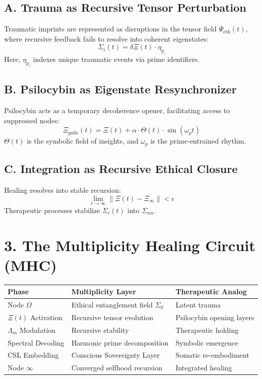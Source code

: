 \documentclass[12pt]{article}
\begin{document}
\subsection*{A. Trauma as Recursive Tensor Perturbation}
Traumatic imprints are represented as disruptions in the tensor field \( \Psi_{\text{eth}}(t) \), where recursive feedback fails to resolve into coherent eigenstates:
\[
\Sigma_{i}(t) = \delta \Xi(t) \cdot \eta_{p_i}
\]
Here, \( \eta_{p_i} \) indexes unique traumatic events via prime identifiers.

\subsection*{B. Psilocybin as Eigenstate Resynchronizer}
Psilocybin acts as a temporary decoherence opener, facilitating access to suppressed nodes:
\[
\Xi_{\text{psilo}}(t) = \Xi(t) + \alpha \cdot \Theta(t) \cdot \sin(\omega_p t)
\]
\( \Theta(t) \) is the symbolic field of insights, and \( \omega_p \) is the prime-entrained rhythm.

\subsection*{C. Integration as Recursive Ethical Closure}
Healing resolves into stable recursion:
\[
\lim_{t \to \infty} \|\Xi(t) - \Xi_{\infty}\| < \epsilon
\]
Therapeutic processes stabilize \( \Sigma_i(t) \) into \( \Sigma_{\text{res}} \).

\section*{3. The Multiplicity Healing Circuit (MHC)}
\begin{center}
\begin{tabular}{|l|l|l|}
\hline
\textbf{Phase} & \textbf{Multiplicity Layer} & \textbf{Therapeutic Analog} \\
\hline
Node $\Omega$ & Ethical entanglement field $\Sigma_0$ & Latent trauma \\
\hline
$\Xi(t)$ Activation & Recursive tensor evolution & Psilocybin opening layers \\
\hline
$\Lambda_m$ Modulation & Recursive stability & Therapeutic holding \\
\hline
Spectral Decoding & Harmonic prime decomposition & Symbolic emergence \\
\hline
CSL Embedding & Conscious Sovereignty Layer & Somatic re-embodiment \\
\hline
Node $\infty$ & Converged selfhood recursion & Integrated healing \\
\hline
\end{tabular}
\end{center}
\end{document}
